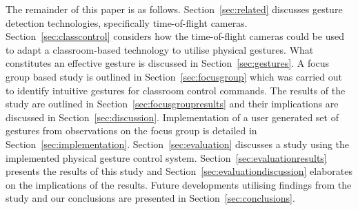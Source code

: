 \documentclass[manuscript, review, screen]{acmart}
\begin{document}
The remainder of this paper is as follows. 
Section~\ref{sec:related} discusses gesture detection technologies, specifically time-of-flight cameras.
Section~\ref{sec:classcontrol} considers how the time-of-flight cameras could be used to adapt a classroom-based technology to utilise physical gestures.
What constitutes an effective gesture is discussed in Section~\ref{sec:gestures}.
A focus group based study is outlined in Section~\ref{sec:focusgroup} which was carried out to identify intuitive gestures for classroom control commands.
The results of the study are outlined in Section~\ref{sec:focusgroupresults} and their implications are discussed in Section~\ref{sec:discussion}. 
Implementation of a user generated set of gestures from observations on the focus group is detailed in Section~\ref{sec:implementation}.
Section~\ref{sec:evaluation} discusses a study using the implemented physical gesture control system.
Section~\ref{sec:evaluationresults} presents the results of this study and Section~\ref{sec:evaluationdiscussion} elaborates on the implications of the results.
Future developments utilising findings from the study and our conclusions are presented in Section~\ref{sec:conclusions}.

















\end{document}
